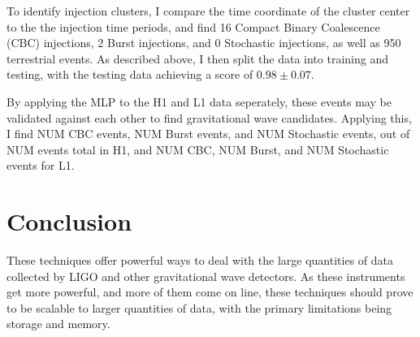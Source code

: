 \documentclass{article}
\begin{document}
To identify injection clusters, I compare the time coordinate of the cluster center to the the injection time periods, and find 16 Compact Binary Coalescence (CBC) injections, 2 Burst injections, and 0 Stochastic injections, as well as 950 terrestrial events. As described above, I then split the data into training and testing, with the testing data achieving a score of $0.98\pm0.07$.

By applying the MLP to the H1 and L1 data seperately, these events may be validated against each other to find gravitational wave candidates. Applying this, I find NUM CBC events, NUM Burst events, and NUM Stochastic events, out of NUM events total in H1, and NUM CBC, NUM Burst, and NUM Stochastic events for L1. 

\section{Conclusion}
These techniques offer powerful ways to deal with the large quantities of data collected by LIGO and other gravitational wave detectors. As these instruments get more powerful, and more of them come on line, these techniques should prove to be scalable to larger quantities of data, with the primary limitations being storage and memory.



\end{document}

